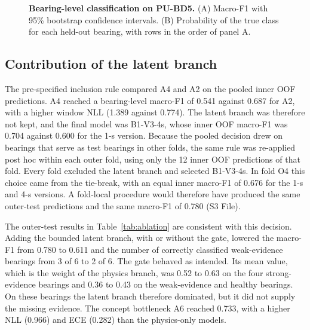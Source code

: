 \documentclass[10pt,letterpaper]{article}
\begin{document}
\begin{figure}[!h]
\caption{\textbf{Bearing-level classification on PU-BD5.} (A) Macro-F1 with 95\% bootstrap confidence intervals. (B) Probability of the true class for each held-out bearing, with rows in the order of panel A.}
\label{fig4}
\end{figure}

\subsection*{Contribution of the latent branch}
The pre-specified inclusion rule compared A4 and A2 on the pooled inner OOF predictions. A4 reached a bearing-level macro-F1 of 0.541 against 0.687 for A2, with a higher window NLL (1.389 against 0.774). The latent branch was therefore not kept, and the final model was B1-V3-4s, whose inner OOF macro-F1 was 0.704 against 0.600 for the 1-s version. Because the pooled decision drew on bearings that serve as test bearings in other folds, the same rule was re-applied post hoc within each outer fold, using only the 12 inner OOF predictions of that fold. Every fold excluded the latent branch and selected B1-V3-4s. In fold O4 this choice came from the tie-break, with an equal inner macro-F1 of 0.676 for the 1-s and 4-s versions. A fold-local procedure would therefore have produced the same outer-test predictions and the same macro-F1 of 0.780 (S3 File).

The outer-test results in Table~\ref{tab:ablation} are consistent with this decision. Adding the bounded latent branch, with or without the gate, lowered the macro-F1 from 0.780 to 0.611 and the number of correctly classified weak-evidence bearings from 3 of 6 to 2 of 6. The gate behaved as intended. Its mean value, which is the weight of the physics branch, was 0.52 to 0.63 on the four strong-evidence bearings and 0.36 to 0.43 on the weak-evidence and healthy bearings. On these bearings the latent branch therefore dominated, but it did not supply the missing evidence. The concept bottleneck A6 reached 0.733, with a higher NLL (0.966) and ECE (0.282) than the physics-only models.
\end{document}

